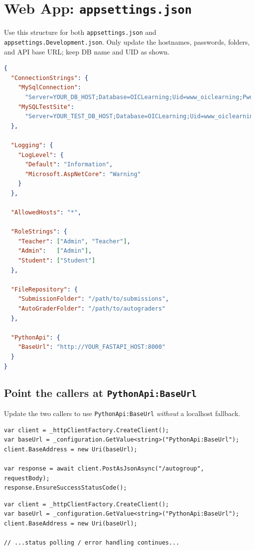 \documentclass[ms,twoside,print]{nuthesis}
\begin{document}
\section{Web App: \texttt{appsettings.json}}
Use this structure for both \texttt{appsettings.json} and \texttt{appsettings.Development.json}.
Only update the hostnames, passwords, folders, and API base URL; keep DB name and UID as shown.

\begin{lstlisting}[language=json]
{
  "ConnectionStrings": {
    "MySqlConnection":
      "Server=YOUR_DB_HOST;Database=OICLearning;Uid=www_oiclearning;Pwd=YOUR_DB_PASSWORD",
    "MySQLTestSite":
      "Server=YOUR_TEST_DB_HOST;Database=OICLearning;Uid=www_oiclearning;Pwd=YOUR_TEST_DB_PASSWORD"
  },

  "Logging": {
    "LogLevel": {
      "Default": "Information",
      "Microsoft.AspNetCore": "Warning"
    }
  },

  "AllowedHosts": "*",

  "RoleStrings": {
    "Teacher": ["Admin", "Teacher"],
    "Admin":   ["Admin"],
    "Student": ["Student"]
  },

  "FileRepository": {
    "SubmissionFolder": "/path/to/submissions",
    "AutoGraderFolder": "/path/to/autograders"
  },

  "PythonApi": {
    "BaseUrl": "http://YOUR_FASTAPI_HOST:8000"
  }
}
\end{lstlisting}

\subsection*{Point the callers at \texttt{PythonApi:BaseUrl}}
Update the two callers to use \texttt{PythonApi:BaseUrl} \emph{without} a localhost fallback.
\noindent
\begin{minipage}{\linewidth}
\begin{lstlisting}[language=CSharp,title=CourseService.cs (snippet)]
var client = _httpClientFactory.CreateClient();
var baseUrl = _configuration.GetValue<string>("PythonApi:BaseUrl");
client.BaseAddress = new Uri(baseUrl);

var response = await client.PostAsJsonAsync("/autogroup", requestBody);
response.EnsureSuccessStatusCode();
\end{lstlisting}
\end{minipage}
\noindent
\begin{minipage}{\linewidth}
\begin{lstlisting}[language=CSharp,title=GroupingService.cs (snippet)]
var client = _httpClientFactory.CreateClient();
var baseUrl = _configuration.GetValue<string>("PythonApi:BaseUrl");
client.BaseAddress = new Uri(baseUrl);

// ...status polling / error handling continues...
\end{lstlisting}
\end{minipage}
\end{document}
